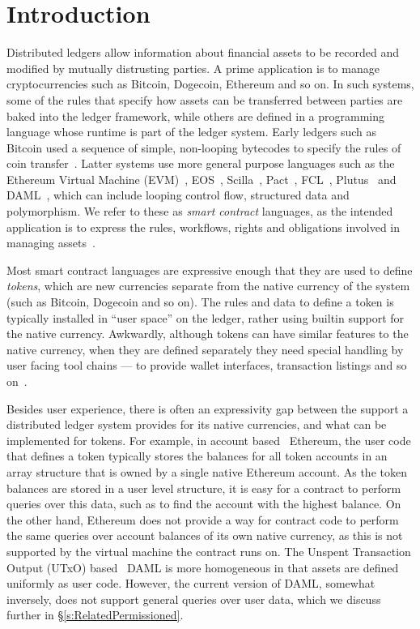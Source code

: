 
\section{Introduction}
Distributed ledgers allow information about financial assets to be recorded and modified by mutually distrusting parties. A prime application is to manage cryptocurrencies such as Bitcoin, Dogecoin, Ethereum and so on. In such systems, some of the rules that specify how assets can be transferred between parties are baked into the ledger framework, while others are defined in a programming language whose runtime is part of the ledger system. Early ledgers such as Bitcoin used a sequence of simple, non-looping bytecodes to specify the rules of coin transfer~\cite{Atzei2017:BitcoinTransactions}. Latter systems use more general purpose languages such as the Ethereum Virtual Machine (EVM)~\cite{Wood2014:Ethereum}, EOS~\cite{Grigg2017:EosIntroduction}, Scilla~\cite{Sergey2018:Scilla}, Pact~\cite{Popejpy2016:Pact}, FCL~\cite{Adjoint2019:FCL}, Plutus~\cite{IOHK2018:Plutus} and DAML~\cite{DA2019:DAML}, which can include looping control flow, structured data and polymorphism. We refer to these as \emph{smart contract} languages, as the intended application is to express the rules, workflows, rights and obligations involved in managing assets~\cite{Harz2018:SurveyLanguages}.

Most smart contract languages are expressive enough that they are used to define \emph{tokens}, which are new currencies separate from the native currency of the system (such as Bitcoin, Dogecoin and so on). The rules and data to define a token is typically installed in ``user space'' on the ledger, rather using builtin support for the native currency. Awkwardly, although tokens can have similar features to the native currency, when they are defined separately they need special handling by user facing tool chains --- to provide wallet interfaces, transaction listings and so on~\cite{Vogelsteller2015:ERC20}.

Besides user experience, there is often an expressivity gap between the support a distributed ledger system provides for its native currencies, and what can be implemented for tokens. For example, in account based~\cite{Zahnentferner2018:Chimeric} Ethereum, the user code that defines a token typically stores the balances for all token accounts in an array structure that is owned by a single native Ethereum account. As the token balances are stored in a user level structure, it is easy for a contract to perform queries over this data, such as to find the account with the highest balance. On the other hand, Ethereum does not provide a way for contract code to perform the same queries  over account balances of its own native currency, as this is not supported by the virtual machine the contract runs on. The Unspent Transaction Output (UTxO) based~\cite{Zahnentferner2018:UTxO} DAML is more homogeneous in that assets are defined uniformly as user code. However, the current version of DAML, somewhat inversely, does not support general queries over user data, which we discuss further in \S\ref{s:RelatedPermissioned}.

